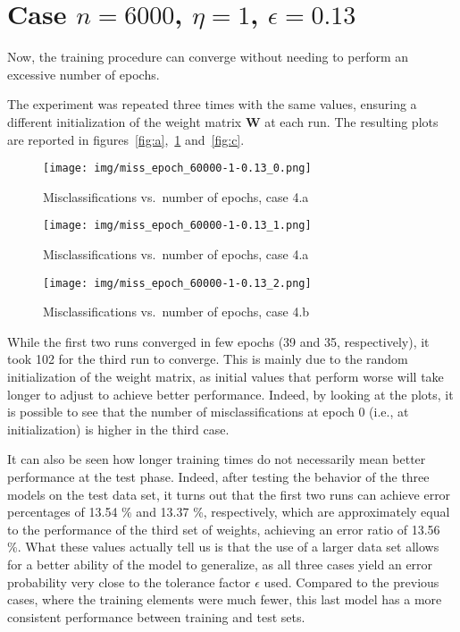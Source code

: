 \documentclass[12pt]{article}
\begin{document}
\section{Case $n=6000$, $\eta=1$, $\epsilon=0.13$}

Now, the training procedure can converge without needing to perform an excessive number of epochs.

The experiment was repeated three times with the same values, ensuring a different initialization of the weight matrix $\textbf{W}$ at each run.
The resulting plots are reported in figures\ \ref{fig:a},\ \ref{fig:b} and\ \ref{fig:c}.

\begin{figure} [ht]
  \begin{minipage}{0.45\linewidth}
  \centering
    \texttt{[image: img/miss\_epoch\_60000-1-0.13\_0.png]}
    \caption{Misclassifications vs.\ number of epochs, case 4.a}
    \label{fig:a}
  \end{minipage}
  \hspace{0.5cm}
  \begin{minipage}{0.45\linewidth}
  \centering
    \texttt{[image: img/miss\_epoch\_60000-1-0.13\_1.png]}
    \caption{Misclassifications vs.\ number of epochs, case 4.a}
    \label{fig:b}
  \end{minipage}
\end{figure}

\begin{figure}[ht]
  \centering
  \texttt{[image: img/miss\_epoch\_60000-1-0.13\_2.png]}
  \caption{Misclassifications vs.\ number of epochs, case 4.b}
  \label{label}
\end{figure}

While the first two runs converged in few epochs (39 and 35, respectively), it took 102 for the third run to converge.
This is mainly due to the random initialization of the weight matrix, as initial values that perform worse will take longer to adjust to achieve better performance.
Indeed, by looking at the plots, it is possible to see that the number of misclassifications at epoch 0 (i.e., at initialization) is higher in the third case.

It can also be seen how longer training times do not necessarily mean better performance at the test phase.
Indeed, after testing the behavior of the three models on the test data set, it turns out that the first two runs can achieve error percentages of 13.54 \% and 13.37 \%, respectively, which are approximately equal to the performance of the third set of weights, achieving an error ratio of 13.56 \%.
What these values actually tell us is that the use of a larger data set allows for a better ability of the model to generalize, as all three cases yield an error probability very close to the tolerance factor $\epsilon$ used.
Compared to the previous cases, where the training elements were much fewer, this last model has a more consistent performance between training and test sets.
\end{document}
